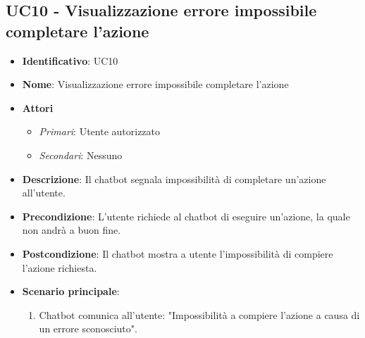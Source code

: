 \subsection{UC10 - Visualizzazione errore impossibile completare l'azione}
\begin{itemize}
	\item \textbf{Identificativo}: UC10
	\item \textbf{Nome}:  Visualizzazione errore impossibile completare l'azione
	\item \textbf{Attori}
	\begin{itemize} 
		\item \textit{Primari}: Utente autorizzato
		\item \textit{Secondari}: Nessuno
	\end{itemize}
	\item \textbf{Descrizione}: Il chatbot segnala impossibilità di completare un'azione all'utente.
	\item \textbf{Precondizione}: L'utente richiede al chatbot di eseguire un'azione, la quale non andrà a buon fine.
	\item \textbf{Postcondizione}: Il chatbot mostra a utente l'impossibilità di compiere l'azione richiesta.
	\item \textbf{Scenario principale}: \begin{enumerate}
		\item Chatbot comunica all'utente: "Impossibilità a compiere l'azione a causa di un errore sconosciuto".
	\end{enumerate}
\end{itemize}